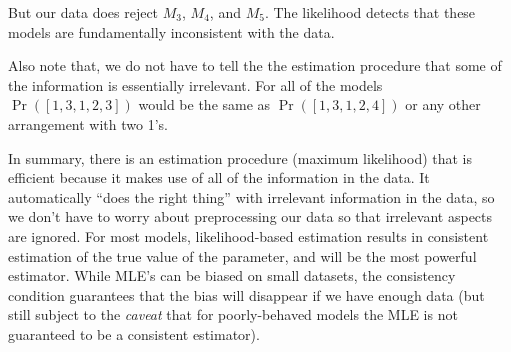 \documentclass[11pt]{article}
\begin{document}
But our data does reject $M_3$, $M_4$, and $M_5$. The likelihood detects that these models are fundamentally inconsistent with the data.

Also note that, we do not have to tell the the estimation procedure that some of the information is essentially irrelevant.
For all of the models $\Pr([1,3,1,2,3])$ would be the same as $\Pr([1,3,1,2,4])$ or any other arrangement with two 1's.

In summary, there is an estimation procedure (maximum likelihood) that is efficient because it makes use of all of the information in the data. It automatically ``does the right thing'' with irrelevant information in the data, so we don't have to worry about preprocessing our data so that irrelevant aspects are ignored.
For most models, likelihood-based estimation results in consistent estimation of the true value of the parameter, and will be the most powerful estimator. 
While MLE's can be biased on small datasets, the consistency condition guarantees that the bias will disappear if we have enough data (but still subject to the {\em caveat} that for poorly-behaved models the MLE is not guaranteed to be a consistent estimator).

 
\end{document}

